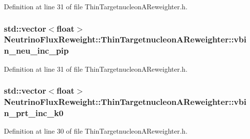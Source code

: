 Definition at line 31 of file Thin\-Targetnucleon\-A\-Reweighter.\-h.

\hypertarget{class_neutrino_flux_reweight_1_1_thin_targetnucleon_a_reweighter_ae47fb7b28a9a98bcf896bc93b96c371d}{
\subsubsection[{vbin\-\_\-neu\-\_\-inc\-\_\-pip}]{\setlength{\rightskip}{0pt plus 5cm}std\-::vector$<$float$>$ Neutrino\-Flux\-Reweight\-::\-Thin\-Targetnucleon\-A\-Reweighter\-::vbin\-\_\-neu\-\_\-inc\-\_\-pip}}\label{class_neutrino_flux_reweight_1_1_thin_targetnucleon_a_reweighter_ae47fb7b28a9a98bcf896bc93b96c371d}


Definition at line 31 of file Thin\-Targetnucleon\-A\-Reweighter.\-h.

\hypertarget{class_neutrino_flux_reweight_1_1_thin_targetnucleon_a_reweighter_abc9e0de56770183d6108172ae1673b6d}{
\subsubsection[{vbin\-\_\-prt\-\_\-inc\-\_\-k0}]{\setlength{\rightskip}{0pt plus 5cm}std\-::vector$<$float$>$ Neutrino\-Flux\-Reweight\-::\-Thin\-Targetnucleon\-A\-Reweighter\-::vbin\-\_\-prt\-\_\-inc\-\_\-k0}}\label{class_neutrino_flux_reweight_1_1_thin_targetnucleon_a_reweighter_abc9e0de56770183d6108172ae1673b6d}


Definition at line 30 of file Thin\-Targetnucleon\-A\-Reweighter.\-h.

